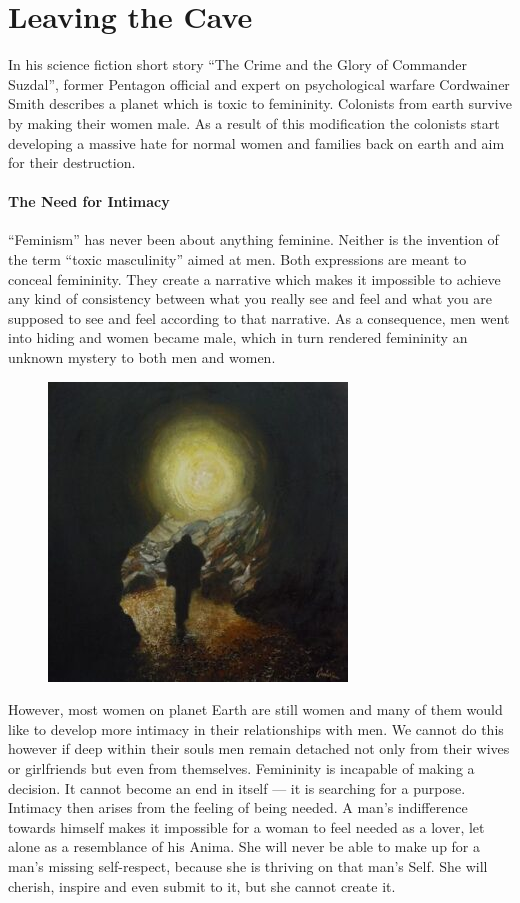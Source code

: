 \section{Leaving the Cave}


In his science fiction short story “The Crime and the Glory of Commander Suzdal”, former Pentagon official and expert on psychological warfare Cordwainer Smith describes a planet which is toxic to femininity. Colonists from earth survive by making their women male. As a result of this modification the colonists start developing a massive hate for normal women and families back on earth and aim for their destruction.

\paragraph{The Need for Intimacy}
“Feminism” has never been about anything feminine. Neither is the invention of the term “toxic masculinity” aimed at men. Both expressions are meant to conceal femininity. They create a narrative which makes it impossible to achieve any kind of consistency between what you really see and feel and what you are supposed to see and feel according to that narrative. As a consequence, men went into hiding and women became male, which in turn rendered femininity an unknown mystery to both men and women.

\begin{figure}
\centering
 \includegraphics[scale=.75]{a20210113LeavingtheCave-img001.jpg}
\end{figure}

However, most women on planet Earth are still women and many of them would like to develop more intimacy in their relationships with men. We cannot do this however if deep within their souls men remain detached not only from their wives or girlfriends but even from themselves. Femininity is incapable of making a decision. It cannot become an end in itself — it is searching for a purpose. Intimacy then arises from the feeling of being needed. A man's indifference towards himself makes it impossible for a woman to feel needed as a lover, let alone as a resemblance of his Anima. She will never be able to make up for a man's missing self-respect, because she is thriving on that man's Self. She will cherish, inspire and even submit to it, but she cannot create it.

